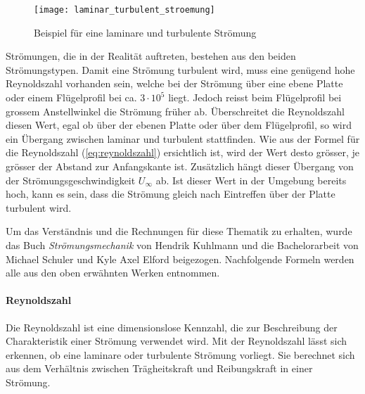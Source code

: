         \begin{figure}[htb!]
        \begin{center}
        \texttt{[image: laminar\_turbulent\_stroemung]}
        \caption{Beispiel für eine laminare und turbulente Strömung \cite{Backus66}}
        \label{fig:laminare_und_trubulente_stroemung}
        \end{center}
        \end{figure}

Strömungen, die in der Realität auftreten, bestehen aus den beiden
Strömungstypen. Damit eine Strömung turbulent wird, muss eine genügend
hohe Reynoldszahl vorhanden sein, welche bei der Strömung über eine
ebene Platte oder einem Flügelprofil bei ca. $3 \cdot 10^5$
liegt. Jedoch reisst beim Flügelprofil bei grossem Anstellwinkel die
Strömung früher ab. Überschreitet die Reynoldszahl diesen Wert, egal
ob über der ebenen Platte oder über dem Flügelprofil, so wird ein Übergang
zwischen laminar und turbulent stattfinden. Wie aus der Formel für die
Reynoldszahl (\ref{eq:reynoldszahl}) ersichtlich ist, wird der Wert
desto grösser, je grösser der Abstand zur Anfangskante ist. Zusätzlich hängt dieser Übergang von der Strömungsgeschwindigkeit $U_\infty$ ab. Ist dieser Wert in der Umgebung bereits hoch, kann es sein, dass die Strömung gleich nach Eintreffen über der Platte turbulent wird.


Um das Verständnis und die Rechnungen für diese Thematik zu erhalten, wurde das Buch \textit{Strömungsmechanik} von Hendrik Kuhlmann \cite[Kap. 7]{Backus67} und die Bachelorarbeit von Michael Schuler und Kyle Axel Elford \cite{Bay00} beigezogen. Nachfolgende Formeln werden alle aus den oben erwähnten Werken entnommen.\\


\paragraph{Reynoldszahl} 
\label{para:reynoldszahl_theorie}
$\;$ \\Die Reynoldszahl ist eine dimensionslose Kennzahl, die zur Beschreibung der Charakteristik einer Strömung  verwendet wird. Mit der Reynoldszahl lässt sich erkennen, ob eine laminare oder turbulente Strömung vorliegt. Sie berechnet sich aus dem Verhältnis zwischen Trägheitskraft und Reibungskraft in einer Strömung.

